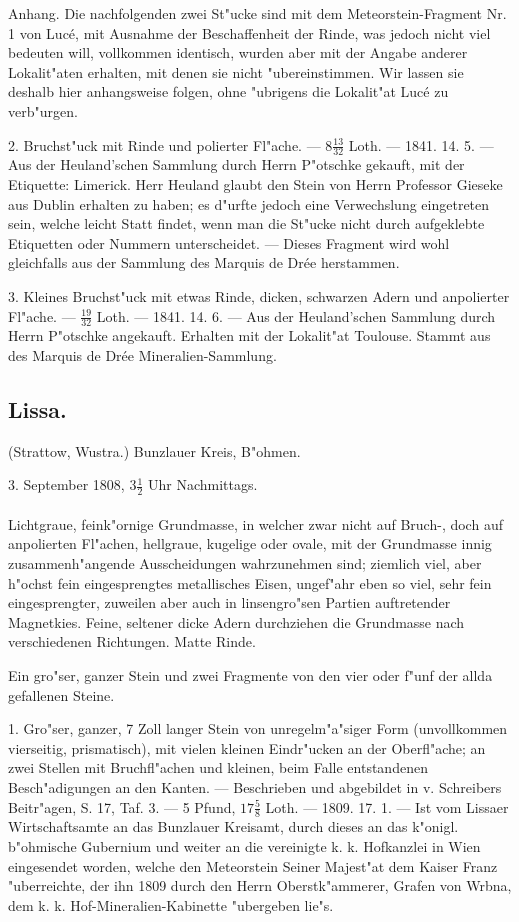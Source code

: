 \documentclass[a4paper, 11pt, oneside, polutonikogreek, german]{article}
\begin{document}
Anhang. Die nachfolgenden zwei St"ucke sind mit dem Meteorstein-Fragment Nr. 1 von Lucé, mit Ausnahme der Beschaffenheit der Rinde, was jedoch nicht viel bedeuten will, vollkommen identisch, wurden aber mit der Angabe anderer Lokalit"aten erhalten, mit denen sie nicht "ubereinstimmen. Wir lassen sie deshalb hier anhangsweise folgen, ohne "ubrigens die Lokalit"at Lucé zu verb"urgen.

2. Bruchst"uck mit Rinde und polierter Fl"ache. --- $8\frac{13}{32}$ Loth. --- 1841. 14. 5. --- Aus der Heuland'schen Sammlung durch Herrn P"otschke gekauft, mit der Etiquette: Limerick. Herr Heuland glaubt den Stein von Herrn Professor Gieseke aus Dublin erhalten zu haben; es d"urfte jedoch eine Verwechslung eingetreten sein, welche leicht Statt findet, wenn man die St"ucke nicht durch aufgeklebte Etiquetten oder Nummern unterscheidet. --- Dieses Fragment wird wohl gleichfalls aus der Sammlung des Marquis de Drée herstammen.

3. Kleines Bruchst"uck mit etwas Rinde, dicken, schwarzen Adern und anpolierter Fl"ache. --- $\frac{19}{32}$ Loth. --- 1841. 14. 6. --- Aus der Heuland'schen Sammlung durch Herrn P"otschke angekauft. Erhalten mit der Lokalit"at Toulouse. Stammt aus des Marquis de Drée Mineralien-Sammlung.
\subsection{Lissa.}
\begin{center}
\small
(Strattow, Wustra.) Bunzlauer Kreis, B"ohmen.

3. September 1808, $3\frac{1}{2}$ Uhr Nachmittags.
\end{center}
\paragraph{}
Lichtgraue, feink"ornige Grundmasse, in welcher zwar nicht auf Bruch-, doch auf anpolierten Fl"achen, hellgraue, kugelige oder ovale, mit der Grundmasse innig zusammenh"angende Ausscheidungen wahrzunehmen sind; ziemlich viel, aber h"ochst fein eingesprengtes metallisches Eisen, ungef"ahr eben so viel, sehr fein eingesprengter, zuweilen aber auch in linsengro"sen Partien auftretender Magnetkies. Feine, seltener dicke Adern durchziehen die Grundmasse nach verschiedenen Richtungen. Matte Rinde.

Ein gro"ser, ganzer Stein und zwei Fragmente von den vier oder f"unf der allda gefallenen Steine.

1. Gro"ser, ganzer, 7 Zoll langer Stein von unregelm"a"siger Form (unvollkommen vierseitig, prismatisch), mit vielen kleinen Eindr"ucken an der Oberfl"ache; an zwei Stellen mit Bruchfl"achen und kleinen, beim Falle entstandenen Besch"adigungen an den Kanten. --- Beschrieben und abgebildet in v. Schreibers Beitr"agen, S. 17, Taf. 3. --- 5 Pfund, $17\frac{5}{8}$ Loth. --- 1809. 17. 1. --- Ist vom Lissaer Wirtschaftsamte an das Bunzlauer Kreisamt, durch dieses an das k"onigl. b"ohmische Gubernium und weiter an die vereinigte k. k. Hofkanzlei in Wien eingesendet worden, welche den Meteorstein Seiner Majest"at dem Kaiser Franz "uberreichte, der ihn 1809 durch den Herrn Oberstk"ammerer, Grafen von Wrbna, dem k. k. Hof-Mineralien-Kabinette "ubergeben lie"s.
\end{document}
